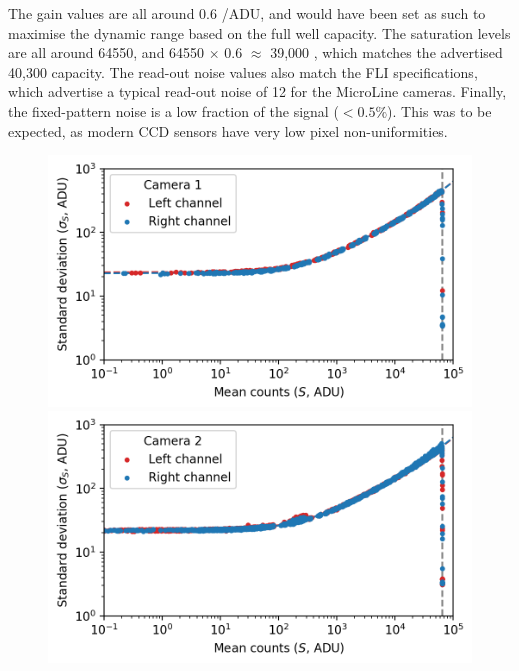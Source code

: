 \begin{colsection}
\begin{colsection}
The gain values are all around 0.6 \elec/ADU, and would have been set as such to maximise the dynamic range based on the full well capacity. The saturation levels are all around 64550, and 64550 $\times$ 0.6 $\approx$ 39,000 \elec, which matches the advertised 40,300 capacity. The read-out noise values also match the FLI specifications, which advertise a typical read-out noise of 12 \elec{} for the MicroLine cameras. Finally, the fixed-pattern noise is a low fraction of the signal ($<0.5\%$). This was to be expected, as modern CCD sensors have very low pixel non-uniformities.

\begin{figure}[p]
    \begin{center}
        \begin{minipage}[t]{0.49\textwidth}\vspace{10pt}
            \includegraphics[width=\linewidth]{images/detectors/ptc_1.png}
        \end{minipage}
        \begin{minipage}[t]{0.49\textwidth}\vspace{10pt}
            \includegraphics[width=\linewidth]{images/detectors/ptc_2.png}
        \end{minipage}


\end{center}
\end{figure}
\end{colsection}
\end{colsection}
